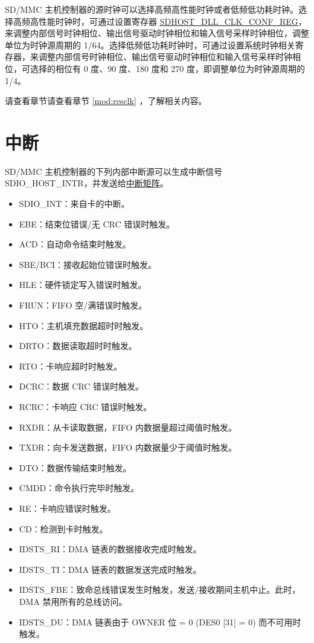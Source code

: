\documentclass[main\_\_CN.tex]{subfiles}
\begin{document}
SD/MMC 主机控制器的源时钟可以选择高频高性能时钟或者低频低功耗时钟。选择高频高性能时钟时，可通过设置寄存器 \hyperref[regdesc:SDHOSTDLLCLKCONFREG]{SDHOST\_DLL\_CLK\_CONF\_REG}，来调整内部信号时钟相位、输出信号驱动时钟相位和输入信号采样时钟相位，调整单位为时钟源周期的 1/64。选择低频低功耗时钟时，可通过设置系统时钟相关寄存器，来调整内部信号时钟相位、输出信号驱动时钟相位和输入信号采样时钟相位，可选择的相位有 0 度、90 度、180 度和 270 度，即调整单位为时钟源周期的 1/4。

请查看章节请查看章节 \ref{mod:resclk} \textit{}，了解相关内容。


\section{中断}

SD/MMC 主机控制器的下列内部中断源可以生成中断信号 SDIO\_HOST\_INTR，并发送给\hyperref[mod:intmtrx]{中断矩阵}。

\begin{itemize}
\item SDIO\_INT：来自卡的中断。
\item EBE：结束位错误/无 CRC 错误时触发。
\item ACD：自动命令结束时触发。
\item SBE/BCI：接收起始位错误时触发。
\item HLE：硬件锁定写入错误时触发。
\item FRUN：FIFO 空/满错误时触发。
\item HTO：主机填充数据超时时触发。
\item DRTO：数据读取超时时触发。
\item RTO：卡响应超时时触发。
\item DCRC：数据 CRC 错误时触发。
\item RCRC：卡响应 CRC 错误时触发。
\item RXDR：从卡读取数据，FIFO 内数据量超过阈值时触发。
\item TXDR：向卡发送数据，FIFO 内数据量少于阈值时触发。
\item DTO：数据传输结束时触发。
\item CMDD：命令执行完毕时触发。
\item RE：卡响应错误时触发。
\item CD：检测到卡时触发。
\item IDSTS\_RI：DMA 链表的数据接收完成时触发。
\item IDSTS\_TI：DMA 链表的数据发送完成时触发。
\item IDSTS\_FBE：致命总线错误发生时触发，发送/接收期间主机中止。此时，DMA 禁用所有的总线访问。
\item IDSTS\_DU：DMA 链表由于 OWNER 位 = 0 (DES0 [31] = 0) 而不可用时触发。
\end{itemize}
\end{document}
